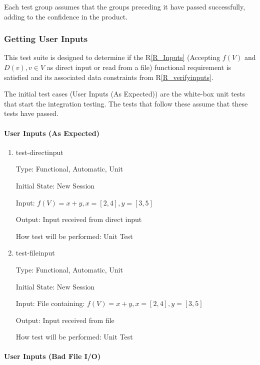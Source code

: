 \documentclass[12pt, titlepage]{article}
\newcommand{\rref}[1]{R\ref{#1}}
\begin{document}
Each test group assumes that the groups preceding it have passed successfully, 
adding to the confidence in the product.

\subsubsection{Getting User Inputs}
\label{tests_gettingInputs}
This test suite is designed to determine if the \rref{R_Inputs} (Accepting 
$f(V)$ and $D(v), v \in V$ as direct input or read from a file) functional 
requirement is satisfied and its associated data constraints from 
\rref{R_verifyinputs}.

The initial test cases (User Inputs (As Expected)) are the white-box unit tests 
that start the integration testing. The tests that follow these assume that 
these tests have passed.

\paragraph{User Inputs (As Expected)}

\begin{enumerate}
	
	\item{test-directinput}
	
	Type: Functional, Automatic, Unit
	
	Initial State: New Session
	
	Input: $f(V) = x + y, x = [2,4], y = [3,5]$
	
	Output: Input received from direct input
	
	How test will be performed: Unit Test\\
	
	\item{test-fileinput}

	Type: Functional, Automatic, Unit
	
	Initial State: New Session
	
	Input: File containing: $f(V) = x + y, x = [2,4], y = [3,5]$
	
	Output: Input received from file
	
	How test will be performed: Unit Test\\
\end{enumerate}
	
\paragraph{User Inputs (Bad File I/O)}
\end{document}
